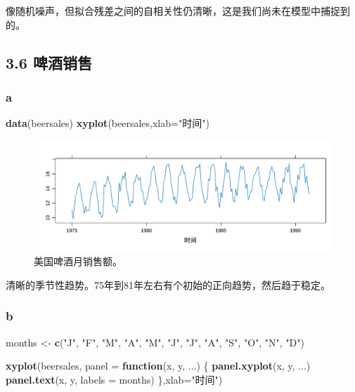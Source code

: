 \documentclass[
]{article}
\newenvironment{Shaded}{\begin{snugshade}}{\end{snugshade}}
\newcommand{\AttributeTok}[1]{\textcolor[rgb]{0.13,0.29,0.53}{#1}}
\newcommand{\ControlFlowTok}[1]{\textcolor[rgb]{0.13,0.29,0.53}{\textbf{#1}}}
\newcommand{\FunctionTok}[1]{\textcolor[rgb]{0.13,0.29,0.53}{\textbf{#1}}}
\newcommand{\NormalTok}[1]{#1}
\newcommand{\OtherTok}[1]{\textcolor[rgb]{0.56,0.35,0.01}{#1}}
\newcommand{\StringTok}[1]{\textcolor[rgb]{0.31,0.60,0.02}{#1}}
\begin{document}
像随机噪声，但拟合残差之间的自相关性仍清晰，这是我们尚未在模型中捕捉到的。

\hypertarget{ux5564ux9152ux9500ux552e}{%
\subsection{3.6 啤酒销售}\label{ux5564ux9152ux9500ux552e}}

\hypertarget{a-2}{%
\subsubsection*{a}\label{a-2}}

\begin{Shaded}
\begin{Highlighting}[]
\FunctionTok{data}\NormalTok{(beersales)}
\FunctionTok{xyplot}\NormalTok{(beersales,}\AttributeTok{xlab=}\StringTok{"时间"}\NormalTok{)}
\end{Highlighting}
\end{Shaded}

\begin{figure}
\centering
\includegraphics{chapter3_files/figure-latex/unnamed-chunk-6-1.pdf}
\caption{\label{fig:unnamed-chunk-6}美国啤酒月销售额。}
\end{figure}

清晰的季节性趋势。75年到81年左右有个初始的正向趋势，然后趋于稳定。

\hypertarget{b-2}{%
\subsubsection*{b}\label{b-2}}

\begin{Shaded}
\begin{Highlighting}[]
\NormalTok{months }\OtherTok{\textless{}{-}} \FunctionTok{c}\NormalTok{(}\StringTok{"J"}\NormalTok{, }\StringTok{"F"}\NormalTok{, }\StringTok{"M"}\NormalTok{, }\StringTok{"A"}\NormalTok{, }\StringTok{"M"}\NormalTok{, }\StringTok{"J"}\NormalTok{, }\StringTok{"J"}\NormalTok{, }\StringTok{"A"}\NormalTok{, }\StringTok{"S"}\NormalTok{, }\StringTok{"O"}\NormalTok{, }\StringTok{"N"}\NormalTok{, }\StringTok{"D"}\NormalTok{)}

\FunctionTok{xyplot}\NormalTok{(beersales,}
       \AttributeTok{panel =} \ControlFlowTok{function}\NormalTok{(x, y, ...) \{}
         \FunctionTok{panel.xyplot}\NormalTok{(x, y, ...)}
         \FunctionTok{panel.text}\NormalTok{(x, y, }\AttributeTok{labels =}\NormalTok{ months)}
\NormalTok{       \},}\AttributeTok{xlab=}\StringTok{"时间"}\NormalTok{)}
\end{Highlighting}
\end{Shaded}
\end{document}
